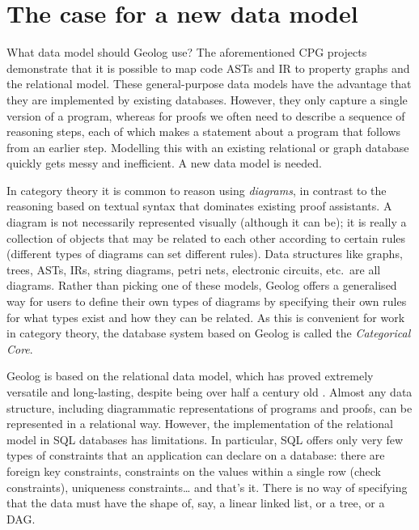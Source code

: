 \documentclass{article}
\begin{document}
\section{The case for a new data model}

What data model should Geolog use?
The aforementioned CPG projects demonstrate that it is possible to map code ASTs and IR to property graphs and the relational model.
These general-purpose data models have the advantage that they are implemented by existing databases.
However, they only capture a single version of a program, whereas for proofs we often need to describe a sequence of reasoning steps, each of which makes a statement about a program that follows from an earlier step.
Modelling this with an existing relational or graph database quickly gets messy and inefficient.
A new data model is needed.

In category theory it is common to reason using \emph{diagrams}, in contrast to the reasoning based on textual syntax that dominates existing proof assistants.
A diagram is not necessarily represented visually (although it can be); it is really a collection of objects that may be related to each other according to certain rules (different types of diagrams can set different rules).
Data structures like graphs, trees, ASTs, IRs, string diagrams, petri nets, electronic circuits, etc.\ are all diagrams.
Rather than picking one of these models, Geolog offers a generalised way for users to define their own types of diagrams by specifying their own rules for what types exist and how they can be related.
As this is convenient for work in category theory, the database system based on Geolog is called the \emph{Categorical Core}.

Geolog is based on the relational data model, which has proved extremely versatile and long-lasting, despite being over half a century old \citep{codd-1970}.
Almost any data structure, including diagrammatic representations of programs and proofs, can be represented in a relational way.
However, the implementation of the relational model in SQL databases has limitations.
In particular, SQL offers only very few types of constraints that an application can declare on a database: there are foreign key constraints, constraints on the values within a single row (check constraints), uniqueness constraints{\dots} and that's it.
There is no way of specifying that the data must have the shape of, say, a linear linked list, or a tree, or a DAG.
\end{document}

